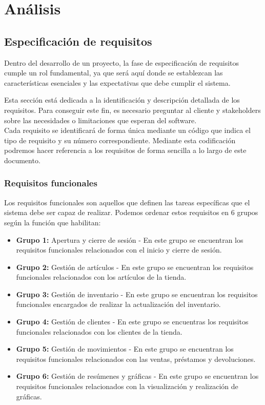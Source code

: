 \chapter{Análisis}
\label{chap:analysis}

\section{Especificación de requisitos}

Dentro del desarrollo de un proyecto, la fase de especificación de requisitos cumple un rol fundamental, ya que será aquí donde se establezcan las características esenciales y las expectativas que debe cumplir el sistema. 

Esta sección está dedicada a la identificación y descripción detallada de los requisitos. Para conseguir este fin, es necesario preguntar al cliente y stakeholders sobre las necesidades o limitaciones que esperan del software.\\
 
Cada requisito se identificará de forma única mediante un código que indica el tipo de requisito y su número correspondiente. Mediante esta codificación podremos hacer referencia a los requisitos de forma sencilla a lo largo de este documento. 


\subsection{Requisitos funcionales}

Los requisitos funcionales son aquellos que definen las tareas específicas que el sistema debe ser capaz de realizar. Podemos ordenar estos requisitos en 6 grupos según la función que habilitan: 

\begin{itemize}
	\item \textbf{Grupo 1:} Apertura y cierre de sesión - En este grupo se encuentran los requisitos funcionales relacionados con el inicio y cierre de sesión.  
	\item \textbf{Grupo 2:} Gestión de artículos - En este grupo se encuentran los requisitos funcionales relacionados con los artículos de la tienda.
	\item \textbf{Grupo 3:} Gestión de inventario - En este grupo se encuentran los requisitos funcionales encargados de realizar la actualización del inventario. 
	\item \textbf{Grupo 4:} Gestión de clientes - En este grupo se encuentras los requisitos funcionales relacionados con los clientes de la tienda. 
	\item \textbf{Grupo 5:} Gestión de movimientos - En este grupo se encuentran los requisitos funcionales relacionados con las ventas, préstamos y devoluciones. 
	\item \textbf{Grupo 6:} Gestión de resúmenes y gráficas - En este grupo se encuentran los requisitos funcionales relacionados con la visualización y realización de gráficas. 
\end{itemize}

